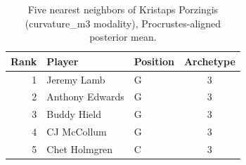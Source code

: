 \begin{table}[htbp]
  \centering\small
  \begin{tabular}{rllc}
    \toprule
    Rank & Player & Position & Archetype \\
    \midrule
    1 & Jeremy Lamb & G & 3 \\
    2 & Anthony Edwards & G & 3 \\
    3 & Buddy Hield & G & 3 \\
    4 & CJ McCollum & G & 3 \\
    5 & Chet Holmgren & C & 3 \\
    \bottomrule
  \end{tabular}
  \caption{Five nearest neighbors of Kristaps Porzingis (curvature_m3 modality), Procrustes-aligned posterior mean.}
  \label{tab:Kristaps_Porzingis_neighbors_curvature_m3}
\end{table}

